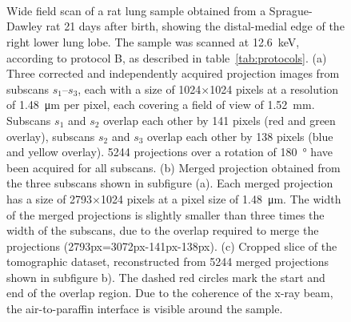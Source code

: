 \ifiucr
	\begin{figure}%
		\caption{%
			Wide field scan of a rat lung sample obtained from a Sprague-Dawley rat 21 days after birth, showing the distal-medial edge of the right lower lung lobe. The sample was scanned at \SI{12.6}{\kilo\electronvolt}, according to protocol B, as described in table~\ref{tab:protocols}. %
			(a) Three corrected and independently acquired projection images from subscans $s_1$--$s_3$, each with a size of 1024\(\times\)1024 pixels at a resolution of \SI{1.48}{\micro\meter} per pixel, each covering a field of view of \SI{1.52}{\milli\meter}. Subscans $s_1$ and $s_2$ overlap each other by 141 pixels (red and green overlay), subscans $s_2$ and $s_3$ overlap each other by 138 pixels (blue and yellow overlay). 5244 projections over a rotation of \SI{180}{\degree} have been acquired for all subscans. %
			(b) Merged projection obtained from the three subscans shown in subfigure (a). Each merged projection has a size of 2793\(\times\)1024 pixels at a pixel size of \SI{1.48}{\micro\meter}. The width of the merged projections is slightly smaller than three times the width of the subscans, due to the overlap required to merge the projections (2793px=3072px-141px-138px). %
			(c) Cropped slice of the tomographic dataset, reconstructed from 5244 merged projections shown in subfigure b). The dashed red circles mark the start and end of the overlap region. Due to the coherence of the x-ray beam, the air-to-paraffin interface is visible around the sample.%
			}%
		\label{fig:wide field scan results}%
		\\%
		\\%
		\\%
	\end{figure}%
\else
